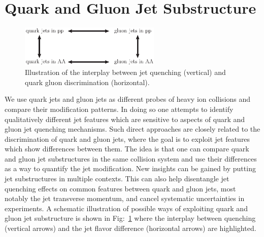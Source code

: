 \documentclass[notoc]{JHEP3}
\begin{document}
\section{Quark and Gluon Jet Substructure}
\label{sec:qg}
\begin{figure}[t]
	   \centering
	   \includegraphics[width=0.6\textwidth]{plots/qg_HI}
	   \caption{Illustration of the interplay between jet quenching (vertical) and quark gluon discrimination (horizontal). }
	   \label{fig:quenching_discrimination}
\end{figure}

We use quark jets and gluon jets as different probes of heavy ion collisions and compare their modification patterns. In doing so one attempts to identify qualitatively different jet features which are sensitive to aspects of quark and gluon jet quenching mechanisms. Such direct approaches are closely related to the discrimination of quark and gluon jets, where the goal is to exploit jet features which show differences between them. The idea is that one can compare quark and gluon jet substructures in the same collision system and use their differences as a way to quantify the jet modification. New insights can be gained by putting jet substructures in multiple contexts. This can also help disentangle jet quenching effects on common features between quark and gluon jets, most notably the jet transverse momentum, and cancel systematic uncertainties in experiments. A schematic illustration of possible ways of exploiting quark and gluon jet substructure is shown in Fig:~\ref{fig:quenching_discrimination} where the interplay between quenching (vertical arrows) and the jet flavor difference (horizontal arrows) are highlighted.
\end{document}
